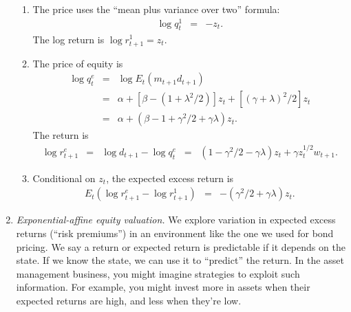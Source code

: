 \documentclass[11pt]{article}
\begin{document}
\begin{enumerate}
\begin{enumerate}
\item  The price uses the ``mean plus variance over two'' formula:
\begin{eqnarray*}
    \log q^1_t  &=& - z_{t} .
\end{eqnarray*}
The log return is $\log r^1_{t+1} = z_t$.

\item  The price of equity is
\begin{eqnarray*}
    \log q^e_t &=& \log E_t (m_{t+1} d_{t+1} ) \\
            &=& \alpha + [\beta - (1+\lambda^2/2)] z_t
                + [(\gamma+\lambda)^2/2 ]  z_t \\
            &=& \alpha + (\beta - 1 + \gamma^2/2 + \gamma\lambda) z_t .
\end{eqnarray*}
The return is
\begin{eqnarray*}
    \log r^e_{t+1} &=& \log d_{t+1} - \log q^e_t
            \;\;=\;\; (1 - \gamma^2/2 - \gamma\lambda) z_t
                + \gamma z_t^{1/2} w_{t+1} .
\end{eqnarray*}
\item  Conditional on $z_t$, the expected excess return is
\begin{eqnarray*}
    E_t (\log r^e_{t+1} - \log r^1_{t+1} )
            &=& - (\gamma^2/2 + \gamma\lambda) z_t .
\end{eqnarray*}
\end{enumerate}

\item {\it Exponential-affine equity valuation.\/}
We explore variation in expected excess returns
(``risk premiums'') in an environment like the one we used for bond pricing.
We say a return or expected return is predictable if it depends on
the state.
If we know the state, we can use it to ``predict'' the return.
In the asset management business, you might imagine strategies to exploit such
information.
For example, you might invest more in assets when their expected returns are high,
and less when they're low.


\end{enumerate}
\end{document}
